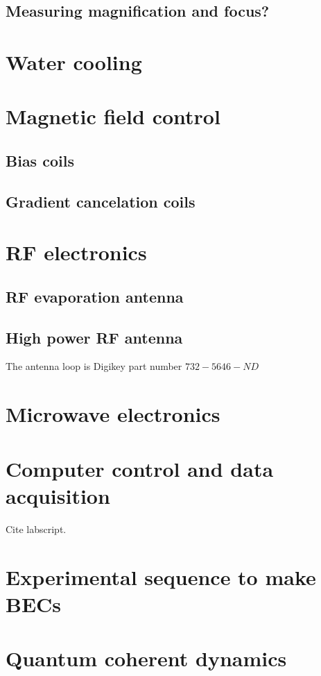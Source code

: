 \subsection{Measuring magnification and focus?}

\section{Water cooling}

\section{Magnetic field control}
\subsection{Bias coils}
\subsection{Gradient cancelation coils}

\section{RF electronics}
\subsection{RF evaporation antenna}
\subsection{High power RF antenna}
\label{sec:high_power_rf_antenna}
The antenna loop is Digikey part number $732-5646-ND$

\section{Microwave electronics}

\section{Computer control and data acquisition}
Cite labscript. 
\section{Experimental sequence to make BECs}
\label{sec:making-becs}



\section{Quantum coherent dynamics}
\label{sec:quantum_coherent_dynamics}


